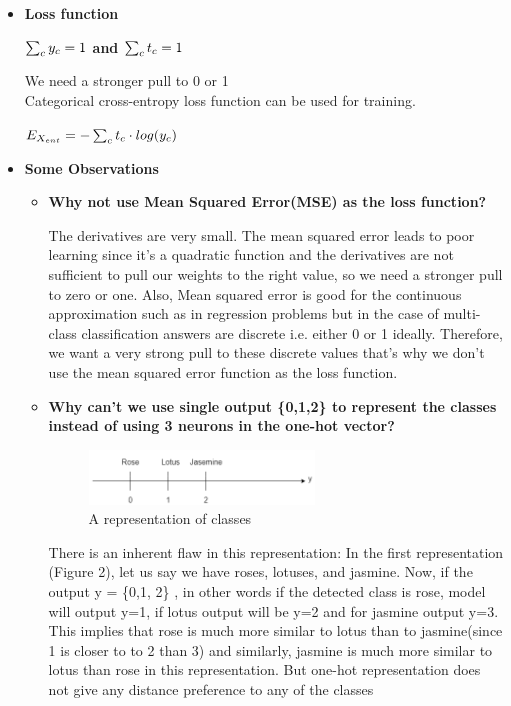 \documentclass[11pt]{article}
\begin{document}
\begin{itemize}


\item{\textbf{Loss function}}
\begin{center}
    \large\bf  $\sum_{c}y\sb{c} = 1$ and $\sum_{c}t\sb{c} = 1$
\end{center}
     We need a stronger pull to 0 or 1\\
     Categorical cross-entropy loss function can be used for training.
    \begin{center}
    \large $E\sb{X\sb{ent}} = -\sum_{c}^{} t\sb{c}\cdot log(y\sb{c})$\\
    \end{center}

\item{\textbf{Some Observations}}
\begin{itemize}
    \item{\bf Why not use Mean Squared Error(MSE) as the loss function?}

The derivatives are very small. The mean squared error leads to poor learning since it's a quadratic function and the derivatives are not sufficient to pull our weights to the right value, so we need a stronger pull to zero or one. Also, Mean squared error is good for the continuous approximation such as in regression problems but in the case of multi-class classification answers are discrete i.e. either 0 or 1 ideally. Therefore, we want a very strong pull to these discrete values that's why we don't use the mean squared error function as the loss function.
\\
\item {\bf Why can't we use single output \{0,1,2\} to represent the classes instead of using 3 neurons in the one-hot vector?}
\begin{figure}[htp]
    \centering
    \includegraphics[width=6cm]{fig2.png}
    \caption{A representation of classes}
    \label{fig:line}
\end{figure}

There is an inherent flaw in this representation: 
In the first representation (Figure 2), let us say we have roses, lotuses, and  jasmine. Now, if the output y = \{0,1, 2\} , in other words if the detected class is rose, model will output y=1, if lotus output will be y=2 and for jasmine output y=3.
This implies that rose is much more similar to lotus than to jasmine(since 1 is closer to to 2 than 3) and similarly,  jasmine is much more similar to lotus than rose in this representation.
But one-hot representation does not give any distance preference to any of the classes
\end{itemize}
\end{itemize}
\end{document}
